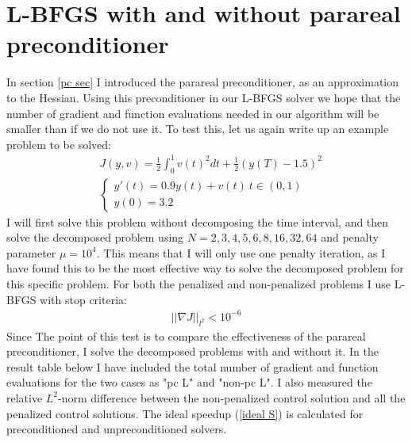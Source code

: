 \section{L-BFGS with and without parareal preconditioner}
In section \ref{pc sec} I introduced the parareal preconditioner, as an approximation to the Hessian. Using this preconditioner in our L-BFGS solver we hope that the number of gradient and function evaluations needed in our algorithm will be smaller than if we do not use it. To test this, let us again write up an example problem to be solved:
\begin{align*}
&J(y,v) = \frac{1}{2}\int_0^1v(t)^2dt + \frac{1}{2}(y(T)-1.5)^2 \\
&\left\{
     \begin{array}{lr}
       	y'(t)=0.9y(t) + v(t) \ t\in(0,1)\\
       	y(0)=3.2
     \end{array}
   \right. 
\end{align*}
I will first solve this problem without decomposing the time interval, and then solve the decomposed problem using $N=2,3,4,5,6,8,16,32,64$ and penalty parameter $\mu=10^4$. This means that I will only use one penalty iteration, as I have found this to be the most effective way to solve the decomposed problem for this specific problem. For both the penalized and non-penalized problems I use L-BFGS with stop criteria:
\begin{align*}
||\nabla J||_{l^2} <10^{-6}
\end{align*}  
Since The point of this test is to compare the effectiveness of the parareal preconditioner, I solve the decomposed problems with and without it. In the result table below I have included the total number of gradient and function evaluations for the two cases as "pc L" and "non-pc L". I also measured the relative $L^2$-norm difference between the non-penalized control solution and all the penalized control solutions. The ideal speedup (\ref{ideal S}) is calculated for preconditioned and unpreconditioned solvers.
\\
\\

